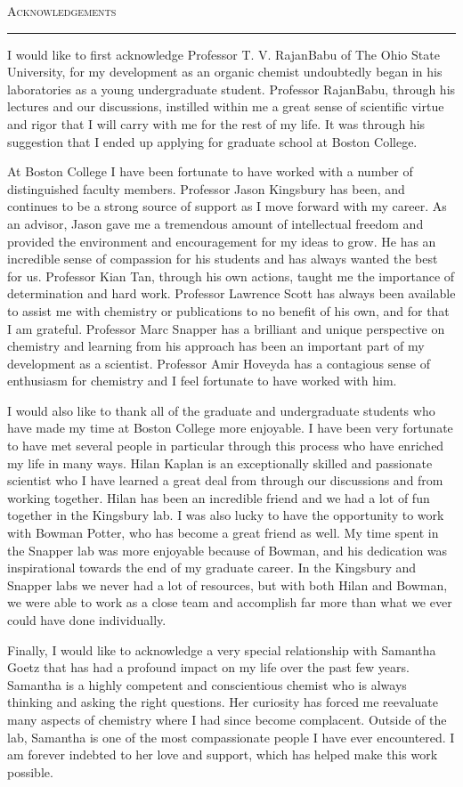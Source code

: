 \noindent \textsc{\Large Acknowledgements} \\
\hrule
\vspace{5mm}
\doublespacing

I would like to first acknowledge Professor T. V. RajanBabu of The Ohio State University, for my
development as an organic chemist undoubtedly began in his laboratories as a young undergraduate
student. Professor RajanBabu, through his lectures and our discussions, instilled within me a great
sense of scientific virtue and rigor that I will carry with me for the rest of my life. It was
through his suggestion that I ended up applying for graduate school at Boston College.


At Boston College I have been fortunate to have worked with a number of distinguished faculty
members. Professor Jason Kingsbury has been, and continues to be a strong source of support as I
move forward with my career. As an advisor, Jason gave me a tremendous amount of intellectual
freedom and provided the environment and encouragement for my ideas to grow. He has an incredible
sense of compassion for his students and has always wanted the best for us. Professor Kian Tan,
through his own actions, taught me the importance of determination and hard work. Professor Lawrence
Scott has always been available to assist me with chemistry or publications to no benefit of his
own, and for that I am grateful. Professor Marc Snapper has a brilliant and unique perspective on
chemistry and learning from his approach has been an important part of my development as a
scientist. Professor Amir Hoveyda has a contagious sense of enthusiasm for chemistry and I feel
fortunate to have worked with him.


I would also like to thank all of the graduate and undergraduate students who have made my time at
Boston College more enjoyable. I have been very fortunate to have met several people in particular
through this process who have enriched my life in many ways. Hilan Kaplan is an exceptionally
skilled and passionate scientist who I have learned a great deal from through our discussions and
from working together. Hilan has been an incredible friend and we had a lot of fun together in the
Kingsbury lab. I was also lucky to have the opportunity to work with Bowman Potter, who has become a
great friend as well. My time spent in the Snapper lab was more enjoyable because of Bowman, and his
dedication was inspirational towards the end of my graduate career. In the Kingsbury and Snapper
labs we never had a lot of resources, but with both Hilan and Bowman, we were able to work as a
close team and accomplish far more than what we ever could have done individually.


Finally, I would like to acknowledge a very special relationship with Samantha Goetz that has had a
profound impact on my life over the past few years. Samantha is a highly competent and conscientious
chemist who is always thinking and asking the right questions. Her curiosity has forced me
reevaluate many aspects of chemistry where I had since become complacent. Outside of the lab,
Samantha is one of the most compassionate people I have ever encountered. I am forever indebted to
her love and support, which has helped make this work possible.



